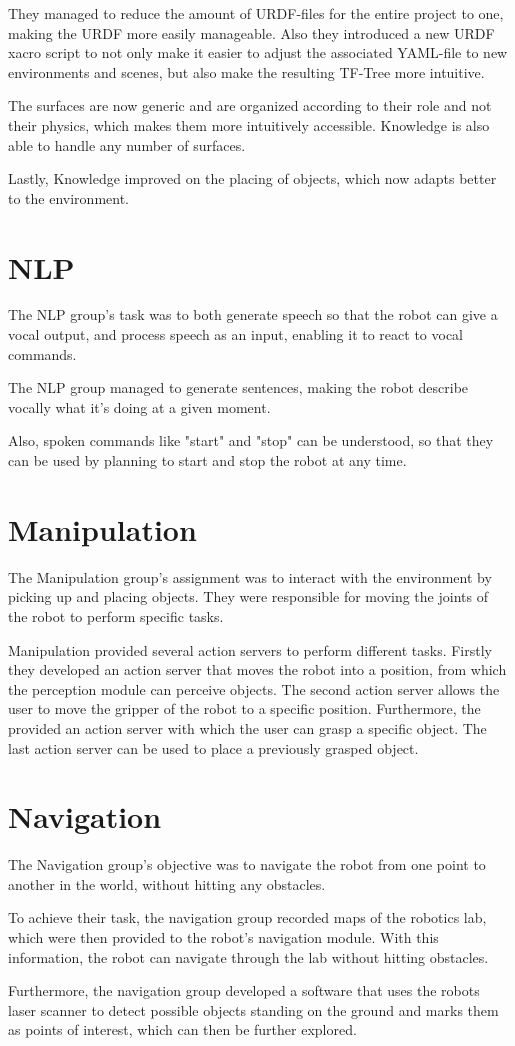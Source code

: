 \documentclass[main.tex]{subfiles}
\begin{document}
		They managed to reduce the amount of URDF-files for the entire project to one, making the URDF more easily manageable.  Also they introduced a new URDF xacro script to not only make it easier to adjust the associated YAML-file to new environments and scenes, but also make the resulting TF-Tree more intuitive.
		
		The surfaces are now generic and are organized according to their role and not their physics, which makes them more intuitively accessible. Knowledge is also able to handle any number of surfaces.
		
		Lastly, Knowledge improved on the placing of objects, which now adapts better to the environment.
		 		
		\section{NLP}
		The NLP group's task was to both generate speech so that the robot can give a vocal output, and process speech as an input, enabling it to react to vocal commands.
		
		The NLP group managed to generate sentences, making the robot describe vocally what it's doing at a given moment.
		
		Also, spoken commands like "start" and "stop" can be understood, so that they can be used by planning to start and stop the robot at any time.
		
		\section{Manipulation}
		The Manipulation group's assignment was to interact with the environment by picking up and placing objects. They were responsible for moving the joints of the robot to perform specific tasks.
		
		Manipulation provided several action servers to perform different tasks. Firstly they developed an action server that moves the robot into a position, from which the perception module can perceive objects. The second action server allows the user to move the gripper of the robot to a specific position. Furthermore, the provided an action server with which the user can grasp a specific object. The last action server can be used to place a previously grasped object.
		
		\section{Navigation}	  	
		The Navigation group's objective was to navigate the robot from one point to another in the world, without hitting any obstacles.
		
		To achieve their task, the navigation group recorded maps of the robotics lab, which were then provided to the robot's navigation module. With this information, the robot can navigate through the lab without hitting obstacles.
		
		Furthermore, the navigation group developed a software that uses the robots laser scanner to detect possible objects standing on the ground and marks them as points of interest, which can then be further explored.

		
	\endgroup
\end{document}
